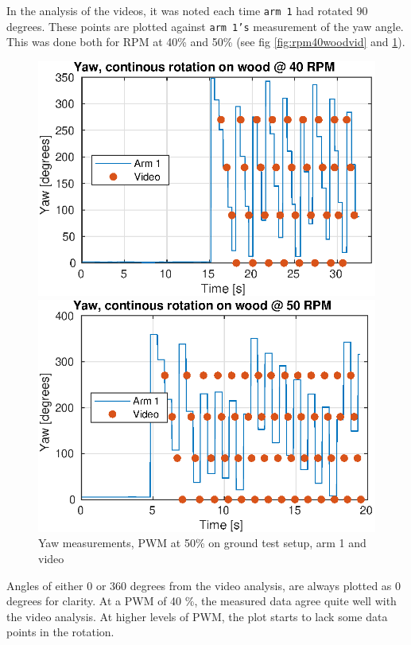 In the analysis of the videos, it was noted each time \texttt{arm 1} had rotated 90 degrees. These points are plotted against \texttt{arm 1's} measurement of the yaw angle. This was done both for RPM at 40\% and 50\% (see fig \ref{fig:rpm40woodvid} and \ref{fig:rpm50woodvid}). 
\begin{figure}[h!]
    \centering
    \begin{minipage}[t]{0.48\textwidth}
        \centering
        \includegraphics[width=1\textwidth]{figures/results/Yaw_rpm40_wood.eps}
        \caption{Yaw measuremnets, PWM at 40\% on ground test setup, arm 1 and video}
    \label{fig:rpm40woodvid}
    \end{minipage}%
    \hspace{.03\textwidth}
    \begin{minipage}[t]{0.48\textwidth}
        \centering
        \includegraphics[width=1\textwidth]{figures/results/Yaw_rpm50_wood.eps}
        \caption{Yaw measurements, PWM at 50\% on ground test setup, arm 1 and video}
        \label{fig:rpm50woodvid}
    \end{minipage}
\end{figure} 
Angles of either 0 or 360 degrees from the video analysis, are always plotted as 0 degrees for clarity.
At a PWM of 40 \%, the measured data agree quite well with the video analysis. At higher levels of PWM, the plot starts to lack some data points in the rotation. 

